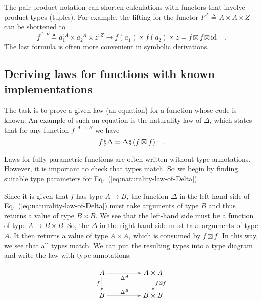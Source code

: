 The pair product notation can shorten calculations with functors that
involve product types (tuples). For example, the lifting for the functor
$F^{A}\triangleq A\times A\times Z$ can be shortened to
\[
f^{\uparrow F}\triangleq a_{1}^{:A}\times a_{2}^{:A}\times z^{:Z}\rightarrow f(a_{1})\times f(a_{2})\times z=f\boxtimes f\boxtimes\text{id}\quad.
\]
The last formula is often more convenient in symbolic derivations. 

\subsection{Deriving laws for functions with known implementations}

The task is to prove a given law (an equation) for a function whose
code is known. An example of such an equation is the naturality
law of $\Delta$, which states that for any function $f^{:A\rightarrow B}$
we have
\begin{equation}
f\bef\Delta=\Delta\bef(f\boxtimes f)\quad.\label{eq:naturality-law-of-Delta}
\end{equation}

Laws for fully parametric functions are often written without type
annotations. However, it is important to check that types match. So
we begin by finding suitable type parameters for Eq.~(\ref{eq:naturality-law-of-Delta}).

Since it is given that $f$ has type $A\rightarrow B$, the function
$\Delta$ in the left-hand side of Eq.~(\ref{eq:naturality-law-of-Delta})
must take arguments of type $B$ and thus returns a value of type
$B\times B$. We see that the left-hand side must be a function of
type $A\rightarrow B\times B$. So, the $\Delta$ in the right-hand
side must take arguments of type $A$. It then returns a value of
type $A\times A$, which is consumed by $f\boxtimes f$. In this way,
we see that all types match. We can put the resulting types into a
type diagram and write the law with type annotations:

\begin{wrapfigure}{L}{0.25\columnwidth}%
\vspace{-2\baselineskip}
\[
\xymatrix{\xyScaleY{1.6pc}\xyScaleX{4.0pc}A\ar[d]\sb(0.45){f}\ar[r]\sb(0.45){\Delta^{A}} & A\times A\ar[d]\sp(0.45){f\boxtimes f}\\
B\ar[r]\sp(0.45){\Delta^{B}} & B\times B
}
\]
\vspace{-0.1\baselineskip}
\end{wrapfigure}%

